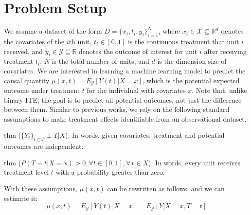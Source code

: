 \documentclass[letterpaper]{article} %
\begin{document}
\section{Problem Setup}
We assume a dataset of the form $D=\{x_i, t_i, y_i\}_{i=1}^N$, where $x_i \in 
\mathcal{X} \subseteq \mathbb{R}^d$ denotes the covariates of the $i$th unit, 
$t_i \in [0, 1]$ is the continuous treatment that unit $i$ received, and $y_i 
\in \mathcal{Y} \subseteq \mathbb{R}$ denotes the outcome of interest for unit 
$i$ after receiving treatment $t_i$. $N$ is the total number of units, and $d$ 
is the dimension size of covariates. We are interested in learning a machine 
learning model to predict the causal quantity $\mu(x, t) = E_{\mathcal{Y}}[Y(t) 
| X = x]$, which is the potential expected outcome under treatment $t$ for the 
individual with covariates $x$. Note that, unlike binary ITE, the goal is to 
predict all potential outcomes, not just the difference between them. Similar to 
previous works, we rely on the following standard assumptions to make treatment 
effects identifiable from an observational dataset.
\newline
\newline
\begin{restatable*}{thm}{}
\label{ass1}
($\{Y_t\}_{t \in T} \perp T | X$). In words, given covariates, treatment and potential outcomes are independent.
\end{restatable*}
\newline
\newline
\begin{restatable*}{thm}{} 
\label{ass2}
($P(T=t|X= x) > 0, \forall t \in [0,1], \forall x \in X$). In words, every unit receives treatment level $t$ with a probability greater than zero.
\end{restatable*}
\newline
\newline
With these assumptions, $\mu(x, t)$ can be rewritten as follows, and we can estimate it:
\[
\mu(x, t) = E_{\mathcal{Y}} [Y(t) | X= x] = E_{\mathcal{Y}} [Y | X = x, T = t]
\]
\end{document}
